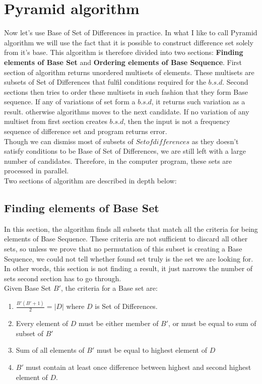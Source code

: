 \section{Pyramid algorithm}
Now let's use Base of Set of Differences in practice. In what I like to call Pyramid algorithm we will use the fact that it is possible to construct difference set solely from it's base. This algorithm is therefore divided into two sections: \textbf{Finding elements of Base Set} and \textbf{Ordering elements of Base Sequence}. First section of algorithm returns unordered multisets of elements. These multisets are subsets of Set of Differences that fulfil conditions required for the $b.s.d$. Second sections then tries to order these multisets in such fashion that they form Base sequence. If any of variations of set form a $b.s.d$, it returns such variation as a result. otherwise algorithms moves to the next candidate. If no variation of any multiset from first section creates $b.s.d$, then the input is not a frequency sequence of difference set and program returns error.\\

Though we can dismiss most of subsets of $Set of differences$ as they doesn't satisfy conditions to be Base of Set of Differences, we are still left with a large number of candidates. Therefore, in the computer program, these sets are processed in parallel.\\

Two sections of algorithm are described in depth below:\\

\subsection{Finding elements of Base Set}
In this section, the algorithm finds all subsets that match all the criteria for being elements of Base Sequence. These criteria are not sufficient to discard all other sets, so unless we prove that no permutation of this subset is creating a Base Sequence, we could not tell whether found set truly is the set we are looking for. In other words, this section is not finding a result, it just narrows the number of sets second section has to go through.\\

Given Base Set $B'$, the criteria for a Base set are:
\begin{enumerate}
\item $\frac{B'(B' + 1)}{2} = |D|$ where $D$ is Set of Differences.  
\item Every element of $D$ must be either member of $B'$, or must be equal to sum of subset of $B'$
\item Sum of all elements of $B'$ must be equal to highest element of $D$
\item $B'$ must contain at least once difference between highest and second highest element of $D$.
\end{enumerate}

